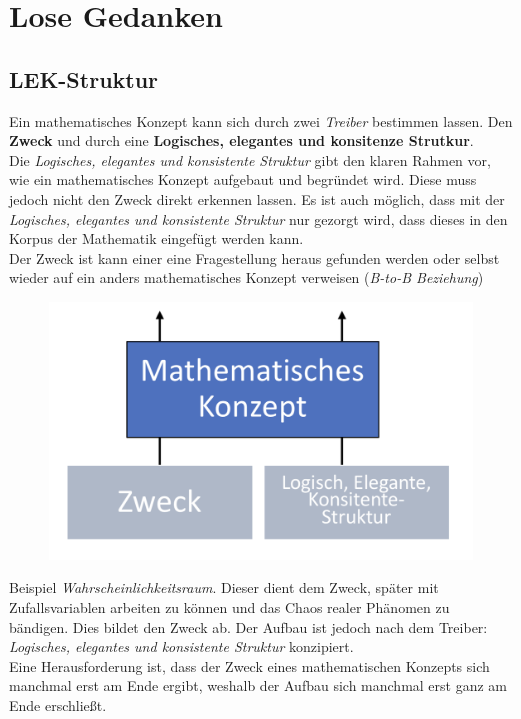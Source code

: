 \chapter{Lose Gedanken} 
\setcounter{section}{0}
\section{LEK-Struktur}

Ein mathematisches Konzept kann sich durch zwei \textit{Treiber} bestimmen lassen. Den \textbf{Zweck} und durch eine \textbf{Logisches, elegantes und konsitenze Strutkur}.\\

Die \textit{Logisches, elegantes und konsistente Struktur} gibt den klaren Rahmen vor, wie ein mathematisches Konzept aufgebaut und begründet wird. Diese muss jedoch nicht den Zweck direkt erkennen lassen. Es ist auch möglich, dass mit der \textit{Logisches, elegantes und konsistente Struktur} nur gezorgt wird, dass dieses in den Korpus der Mathematik eingefügt werden kann. \\

Der Zweck ist kann einer eine Fragestellung heraus gefunden werden oder selbst wieder auf ein anders mathematisches Konzept verweisen (\textit{B-to-B Beziehung})

\begin{figure}[H]
	\centering
	\includegraphics[width=0.3\linewidth]{attachment/chapter_8/Scc013}
\end{figure}

Beispiel \textit{Wahrscheinlichkeitsraum}. Dieser dient dem Zweck, später mit Zufallsvariablen arbeiten zu können und das Chaos realer Phänomen zu bändigen. Dies bildet den Zweck ab. Der Aufbau ist jedoch nach dem Treiber: \textit{Logisches, elegantes und konsistente Struktur} konzipiert.\\

Eine Herausforderung ist, dass der Zweck eines mathematischen Konzepts sich manchmal erst am Ende ergibt, weshalb der Aufbau sich manchmal erst ganz am Ende erschließt.
